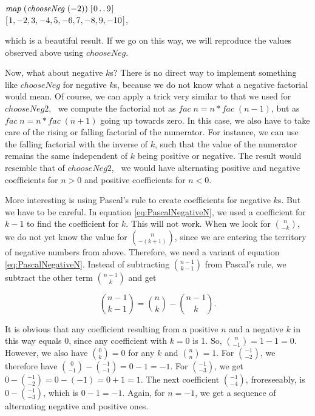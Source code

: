 \documentclass[tikz]{scrreprt}
\newcommand{\Varid}[1]{\mathit{#1}}
\begin{document}
\ensuremath{\Varid{map}\;(\Varid{chooseNeg}\;(\mathbin{-}\mathrm{2}))\;[\mskip1.5mu \mathrm{0}\mathinner{\ldotp\ldotp}\mathrm{9}\mskip1.5mu]}\\
\ensuremath{[\mskip1.5mu \mathrm{1},\mathbin{-}\mathrm{2},\mathrm{3},\mathbin{-}\mathrm{4},\mathrm{5},\mathbin{-}\mathrm{6},\mathrm{7},\mathbin{-}\mathrm{8},\mathrm{9},\mathbin{-}\mathrm{10}\mskip1.5mu]},

which is a beautiful result.
If we go on this way, we will reproduce the values observed above
using \ensuremath{\Varid{chooseNeg}}.

Now, what about negative $k$s?
There is no direct way to implement something like \ensuremath{\Varid{chooseNeg}}
for negative $k$s, because we do not know what
a negative factorial would mean.
Of course, we can apply a trick 
very similar to that we used for \ensuremath{\Varid{chooseNeg2}},
\ie\ we compute the factorial not as
\ensuremath{\Varid{fac}\;\Varid{n}\mathrel{=}\Varid{n}\mathbin{*}\Varid{fac}\;(\Varid{n}\mathbin{-}\mathrm{1})}, but as
\ensuremath{\Varid{fac}\;\Varid{n}\mathrel{=}\Varid{n}\mathbin{*}\Varid{fac}\;(\Varid{n}\mathbin{+}\mathrm{1})} going up towards zero.
In this case, we also have to take care of
the rising or falling factorial of the numerator.
For instance, we can use 
the falling factorial with the inverse of $k$,
such that the value of the numerator remains
the same independent of $k$ being positive or
negative. The result would resemble that
of \ensuremath{\Varid{chooseNeg2}}, \ie\ we would have
alternating positive and negative coefficients
for $n > 0$ and positive coefficients for $n < 0$.

More interesting is using Pascal's rule
to create coefficients for negative $k$s.
But we have to be careful.
In equation \ref{eq:PascalNegativeN},
we used a coefficient for $k-1$
to find the coefficient for $k$.
This will not work. When we look for
$\binom{n}{-k}$, we do not yet know 
the value for $\binom{n}{-(k+1)}$,
since we are entering the territory
of negative numbers from above.
Therefore, we need a variant of 
equation \ref{eq:PascalNegativeN}.
Instead of subtracting $\binom{n-1}{k-1}$
from Pascal's rule, we subtract the other
term $\binom{n-1}{k}$ and get

\begin{equation}\label{eq:PascalNegativeK}
\binom{n-1}{k-1} = \binom{n}{k} - \binom{n-1}{k}.
\end{equation}

It is obvious that any coefficient
resulting from a positive $n$
and a negative $k$ in this way equals 0,
since any coefficient with $k=0$ is 1.
So, $\binom{n}{-1} = 1 - 1 = 0$.
However, we also have $\binom{0}{k} = 0$
for any $k$ and $\binom{n}{n} = 1$.
For $\binom{-1}{-2}$, we therefore have
$\binom{0}{-1} - \binom{-1}{-1} = 0 - 1 = -1$.
For $\binom{-1}{-3}$, we get
$0 - \binom{-1}{-2} = 0 - (-1) = 0 + 1 = 1$.
The next coefficient $\binom{-1}{-4}$,
froreseeably, is $0 - \binom{-1}{-3}$,
which is $0 - 1 = -1$.
Again, for $n=-1$, we get a sequence
of alternating negative and positive ones.
\end{document}
